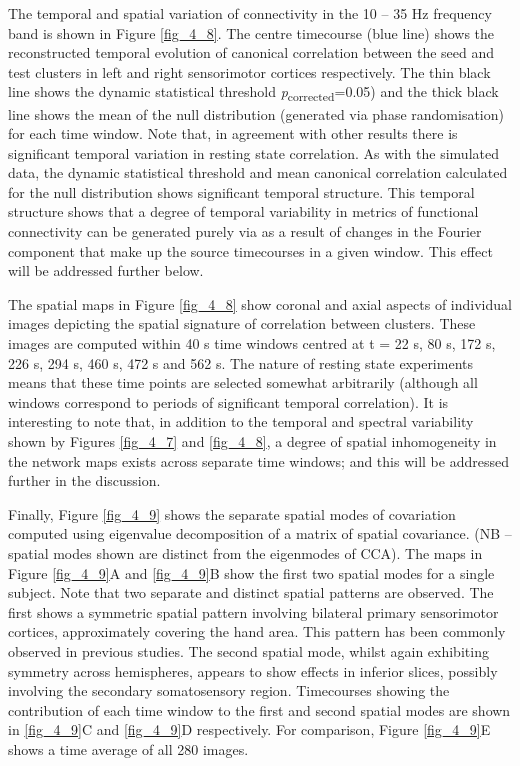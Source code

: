 The temporal and spatial variation of connectivity in the 10 – 35 Hz frequency band is shown in Figure \ref{fig_4_8}. The centre timecourse (blue line) shows the reconstructed temporal evolution of canonical correlation between the seed and test clusters in left and right sensorimotor cortices respectively. The thin black line shows the dynamic statistical threshold \textit{p}\textsubscript{corrected}=0.05) and the thick black line shows the mean of the null distribution (generated via phase randomisation) for each time window. Note that, in agreement with other results \citep{dePasquale2010,Baker2012} there is significant temporal variation in resting state correlation. As with the simulated data, the dynamic statistical threshold and mean canonical correlation calculated for the null distribution shows significant temporal structure. This temporal structure shows that a degree of temporal variability in metrics of functional connectivity can be generated purely via as a result of changes in the Fourier component that make up the source timecourses in a given window. This effect will be addressed further below. 

The spatial maps in Figure \ref{fig_4_8} show coronal and axial aspects of individual images depicting the spatial signature of correlation between clusters. These images are computed within 40 s time windows centred at t = 22 s, 80 s, 172 s, 226 s, 294 s, 460 s, 472 s and 562 s. The nature of resting state experiments means that these time points are selected somewhat arbitrarily (although all windows correspond to periods of significant temporal correlation). It is interesting to note that, in addition to the temporal and spectral variability shown by Figures \ref{fig_4_7} and \ref{fig_4_8}, a degree of spatial inhomogeneity in the network maps exists across separate time windows; and this will be addressed further in the discussion. 

Finally, Figure \ref{fig_4_9} shows the separate spatial modes of covariation computed using eigenvalue decomposition of a matrix of spatial covariance. (NB – spatial modes shown are distinct from the eigenmodes of CCA). The maps in Figure \ref{fig_4_9}A and \ref{fig_4_9}B show the first two spatial modes for a single subject. Note that two separate and distinct spatial patterns are observed. The first shows a symmetric spatial pattern involving bilateral primary sensorimotor cortices, approximately covering the hand area. This pattern has been commonly observed in previous studies. The second spatial mode, whilst again exhibiting symmetry across hemispheres, appears to show effects in inferior slices, possibly involving the secondary somatosensory region. Timecourses showing the contribution of each time window to the first and second spatial modes are shown in \ref{fig_4_9}C and \ref{fig_4_9}D respectively. For comparison, Figure \ref{fig_4_9}E shows a time average of all 280 images. 

